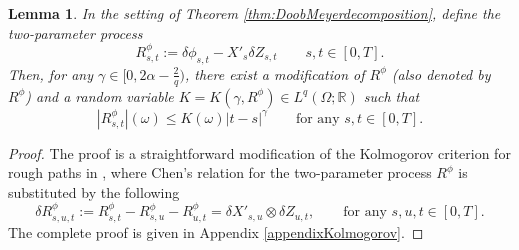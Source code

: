 \documentclass[11pt,a4paper]{article}
\newcommand{\R}{\mathbb{R}}
\newcommand{\E}{\mathbb{E}}
\theoremstyle{plain}
\newtheorem{rmk}[defn]{Remark}
\newtheorem{lemma}[defn]{Lemma}
\begin{document}
    \begin{lemma} \label{lemma:kolmogorov}
    In the setting of Theorem \ref{thm:DoobMeyerdecomposition}, define the two-parameter process \begin{equation*}
        R^{\phi}_{s, t} :=  \delta \phi_{s, t} - X'_s \delta Z_{s, t} \qquad s,t \in [0,T]. 
    \end{equation*}
    Then, for any $\gamma \in [ 0, 2 \alpha - \frac{2}{q})$, there exist a  modification of $R^{\phi}$ (also denoted by $R^{\phi}$) and a random  variable $K = K (\gamma, R^{\phi}) \in L^q(\Omega;\R)$ such that 
    \begin{equation*}
        | R^{\phi}_{s, t} | (\omega) \leqslant K (\omega)  | t - s |^\gamma \qquad \text{for any  $s, t \in [0, T]$} .
    \end{equation*}
    \end{lemma}
    
    \begin{proof}
        The proof is a straightforward modification of the Kolmogorov criterion for rough paths in \cite[Theorem 3.1]{FH20}, where Chen's relation for the two-parameter process $R^\phi$ is substituted by the following 
        \begin{equation*}
            \delta R^{\phi}_{s, u, t} := R^{\phi}_{s, t} - R^{\phi}_{s, u} - R^{\phi}_{u, t} = \delta X'_{s, u} \otimes \delta Z_{u, t}, \qquad \text{for any  $s, u, t \in [0, T]$} .
        \end{equation*}
        The complete proof is given in Appendix \ref{appendixKolmogorov}.      
    \end{proof}

    

   
\end{document}
